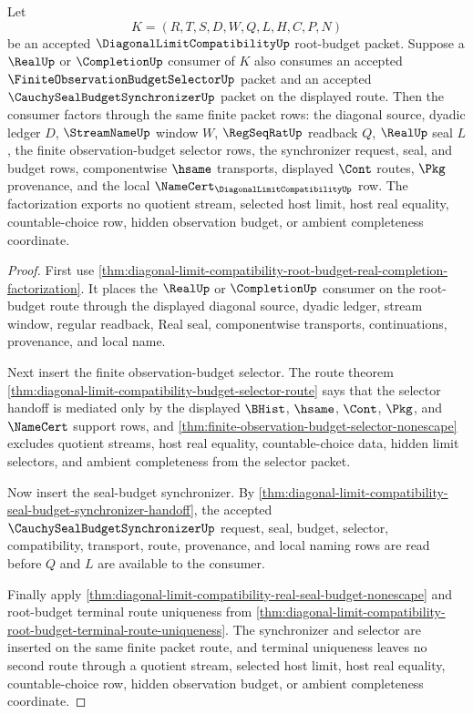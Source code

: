 \begin{theorem}
\label{thm:diagonal-limit-compatibility-finite-observation-budget-factorization}
Let
$$
K=(R,T,S,D,W,Q,L,H,C,P,N)
$$
be an accepted $\DiagonalLimitCompatibilityUp$ root-budget packet. Suppose a $\RealUp$ or $\CompletionUp$ consumer of $K$ also consumes an accepted $\FiniteObservationBudgetSelectorUp$ packet and an accepted $\CauchySealBudgetSynchronizerUp$ packet on the displayed route. Then the consumer factors through the same finite packet rows: the diagonal source, dyadic ledger $D$, $\StreamNameUp$ window $W$, $\RegSeqRatUp$ readback $Q$, $\RealUp$ seal $L$, the finite observation-budget selector rows, the synchronizer request, seal, and budget rows, componentwise $\hsame$ transports, displayed $\Cont$ routes, $\Pkg$ provenance, and the local $\NameCert_{\DiagonalLimitCompatibilityUp}$ row. The factorization exports no quotient stream, selected host limit, host real equality, countable-choice row, hidden observation budget, or ambient completeness coordinate.
\end{theorem}
\begin{proof}
First use \autoref{thm:diagonal-limit-compatibility-root-budget-real-completion-factorization}. It places the $\RealUp$ or $\CompletionUp$ consumer on the root-budget route through the displayed diagonal source, dyadic ledger, stream window, regular readback, Real seal, componentwise transports, continuations, provenance, and local name.

Next insert the finite observation-budget selector. The route theorem \autoref{thm:diagonal-limit-compatibility-budget-selector-route} says that the selector handoff is mediated only by the displayed $\BHist$, $\hsame$, $\Cont$, $\Pkg$, and $\NameCert$ support rows, and \autoref{thm:finite-observation-budget-selector-nonescape} excludes quotient streams, host real equality, countable-choice data, hidden limit selectors, and ambient completeness from the selector packet.

Now insert the seal-budget synchronizer. By \autoref{thm:diagonal-limit-compatibility-seal-budget-synchronizer-handoff}, the accepted $\CauchySealBudgetSynchronizerUp$ request, seal, budget, selector, compatibility, transport, route, provenance, and local naming rows are read before $Q$ and $L$ are available to the consumer.

Finally apply \autoref{thm:diagonal-limit-compatibility-real-seal-budget-nonescape} and root-budget terminal route uniqueness from \autoref{thm:diagonal-limit-compatibility-root-budget-terminal-route-uniqueness}. The synchronizer and selector are inserted on the same finite packet route, and terminal uniqueness leaves no second route through a quotient stream, selected host limit, host real equality, countable-choice row, hidden observation budget, or ambient completeness coordinate.
\end{proof}

